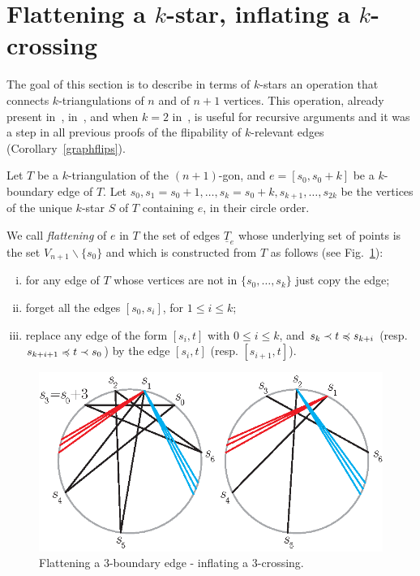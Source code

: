 \documentclass[12pt]{amsart}
\begin{document}



\section{Flattening a $k$-star, inflating a $k$-crossing}\label{sectionflatinflat}

The goal of this section is to describe in terms of $k$-stars an operation that connects $k$-triangulations of $n$ and of $n+1$ vertices. This operation, already present in~\cite{j-gt-03}, in~\cite{n-gdfcp-00}, and when $k=2$ in~\cite{e-btdp-06}, is useful for recursive arguments and it was a step in all previous proofs of the flipability of $k$-relevant edges (Corollary~\ref{graphflips}).


\begin{definition}
Let $T$ be a $k$-triangulation of the $(n+1)$-gon, and $e=[s_0,s_0+k]$ be a $k$-boundary edge of $T$.
Let $s_0,s_1=s_0+1,\ldots,s_k=s_0+k,s_{k+1},\ldots,s_{2k}$ be the vertices of the unique $k$-star $S$ of $T$ containing $e$, in their circle order.

We call \emph{flattening} of $e$ in $T$ the set of edges $\underline{T}_e$ whose underlying set of points is the set $V_{n+1}\smallsetminus\{s_0\}$ and which is constructed from $T$ as follows (see Fig.~\ref{flatinfl}):
\begin{enumerate}[(i)]
\item for any edge of $T$ whose vertices are not in $\{s_0,\ldots,s_k\}$ just copy the edge;
\item forget all the edges $[s_0,s_i]$, for $1\le i\le k$;
\item replace any edge of the form $[s_i,t]$ with $0\le i\le k$, and $s_k\prec t \preccurlyeq s_{k+i}$ (resp. $s_{k+i+1}\preccurlyeq t\prec s_0$) by the edge $[s_i,t]$ (resp. $[s_{i+1},t]$).
\end{enumerate}
\end{definition}

\begin{figure}
\centerline{\includegraphics[scale=1]{flatinfl.eps}}
\caption{\small{Flattening a $3$-boundary edge - inflating a $3$-crossing.}}\label{flatinfl}
\end{figure}
\end{document}
